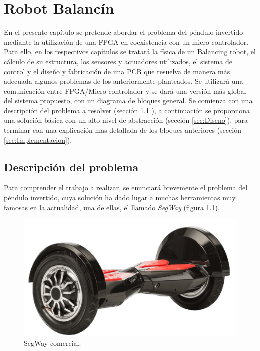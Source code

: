 \chapter{Robot Balancín}\label{sec: BalancingRobot}
En el presente capítulo se pretende abordar el problema del péndulo invertido mediante la utilización de una FPGA en coexistencia con un micro-controlador. Para ello, en los respectivos capítulos se tratará la física de un Balancing robot, el cálculo de su estructura, los sensores y actuadores utilizados, el sistema de control y el diseño y fabricación de una PCB que resuelva de manera más adecuada algunos problemas de los anteriormente planteados. Se utilizará una comunicación entre FPGA/Micro-controlador y se dará una versión más global del sistema propuesto, con un diagrama de bloques general. \newline
Se comienza con una descripción del problema a resolver (sección \ref{sec:Descripcion_balancin}
), a continuación se proporciona una solución básica con un alto nivel de abstracción (sección \ref{sec:Diseno}), para terminar con una explicación mas detallada de los bloques anteriores (sección \ref{sec:Implementacion}).
\section{Descripción del problema} \label{sec:Descripcion_balancin}

Para comprender el trabajo a realizar, se enunciará brevemente el problema del péndulo invertido, cuya solución ha dado lugar a muchas herramientas muy famosas en la actualidad, una de ellas, el llamado \textit{SegWay} (figura \ref{fig:segway}).

\begin{figure}[H]
	\center
	\includegraphics[trim = 0mm 0mm 0mm 0mm, clip,scale=0.4]{imagenes/Balancing_robot/segway}
	\caption{SegWay comercial.}
	\label{fig:segway}
\end{figure}


